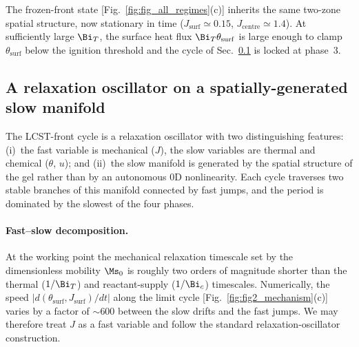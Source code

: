 The frozen-front state [Fig.~\ref{fig:fig_all_regimes}(c)] inherits
the same two-zone spatial structure, now stationary in time
($J_\mathrm{surf}\!\simeq\!0.15$,
$J_\mathrm{centre}\!\simeq\!1.4$).  At sufficiently large $\Bi_T$,
the surface heat flux $\Bi_T\theta_\mathrm{surf}$ is large enough
to clamp $\theta_\mathrm{surf}$ below the ignition threshold and
the cycle of Sec.~\ref{sec:lcst_front_mechanism} is locked at
phase~3.

\subsection{A relaxation oscillator on a spatially-generated slow
manifold}
\label{sec:lcst_front_mechanism}

The LCST-front cycle is a relaxation oscillator with two distinguishing
features: (i)~the fast variable is mechanical ($J$), the slow
variables are thermal and chemical ($\theta$, $u$); and (ii)~the
slow manifold is generated by the spatial structure of the gel rather
than by an autonomous 0D nonlinearity.  Each cycle traverses two
stable branches of this manifold connected by fast jumps, and the
period is dominated by the slowest of the four phases.

\paragraph{Fast--slow decomposition.}  At the working point the
mechanical relaxation timescale set by the dimensionless mobility
$\Ms_0$ is roughly two orders of magnitude shorter than the thermal
($1/\Bi_T$) and reactant-supply ($1/\Bi_c$) timescales.  Numerically,
the speed $|d(\theta_\mathrm{surf}, J_\mathrm{surf})/dt|$ along the
limit cycle [Fig.~\ref{fig:fig2_mechanism}(c)] varies by a factor of
$\sim\!600$ between the slow drifts and the fast jumps.  We may
therefore treat $J$ as a fast variable and follow the standard
relaxation-oscillator construction.

